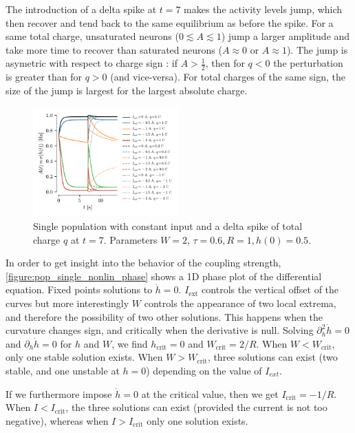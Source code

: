 \documentclass[10pt,conference,compsocconf,a4paper]{IEEEtran}
\newcommand*{\shortautoref}[1]{%
	\begingroup
	\def\equationautorefname{\textsc{Eq.}}%
	\def\tableautorefname{\textsc{Tab.}}%
	\def\figureautorefname{\textsc{Fig.}}%
	\autoref{#1}%
	\endgroup
}
\begin{document}
		The introduction of a delta spike at $t = 7$ makes the activity levels jump, which then recover and tend back to the same equilibrium as before the spike. For a same total charge, unsaturated neurons ($0 \lesssim A \lesssim 1$) jump a larger amplitude and take more time to recover than saturated neurons ($A \approx 0$ or $A \approx 1$). The jump is asymetric with respect to charge sign : if $A > \frac 12$, then for $q < 0$ the perturbation is greater than for $q > 0$ (and vice-versa). For total charges of the same sign, the size of the jump is largest for the largest absolute charge.

		\begin{figure}
			\centering
			\includegraphics[width=0.5\textwidth]{figures/pop_single_nonlin.pdf}
			\caption{Single population with constant input and a delta spike of total charge $q$ at $t = 7$. Parameters $W = 2$, $\tau = 0.6, R = 1, h(0) = 0.5$.}
			\label{figure:pop_single_nonlin}
		\end{figure}

		In order to get insight into the behavior of the coupling strength, \shortautoref{figure:pop_single_nonlin_phase} shows a 1D phase plot of the differential equation. Fixed points solutions to $\dot h = 0$. $I_{\text{ext}}$ controls the vertical offset of the curves but more interestingly $W$ controls the appearance of two local extrema, and therefore the possibility of two other solutions. This happens when the curvature changes sign, and critically when the derivative is null. Solving $\partial^2_h \dot h = 0$ and $\partial_h \dot h = 0$ for $h$ and $W$, we find $h_{\text{crit}} = 0$ and $W_{\text{crit}} = 2/R$. When $W < W_{\text{crit}}$, only one stable solution exists. When $W > W_{\text{crit}}$, three solutions can exist (two stable, and one unstable at $h = 0$) depending on the value of $I_{ext}$.
		
		If we furthermore impose $\dot h = 0$ at the critical value, then we get $I_{\text{crit}} = -1/R$. When $I < I_{\text{crit}}$, the three solutions can exist (provided the current is not too negative), whereas when $I > I_{\text{crit}}$ only one solution exists.
\end{document}

